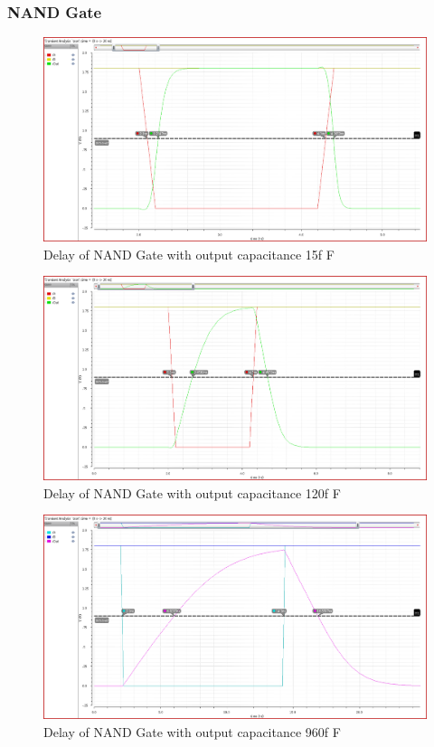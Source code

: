 \documentclass[conference]{IEEEtran}
\begin{document}
\subsubsection{NAND Gate}
\begin{figure}[h!]
    \centering
    \includegraphics[width=0.9\linewidth]{nand2_C1.png}
    \caption{Delay of NAND Gate with output capacitance 15f F}
\end{figure}

\begin{figure}[h!]
    \centering
    \includegraphics[width=0.9\linewidth]{nand2_C2.png}
    \caption{Delay of NAND Gate with output capacitance 120f F}
\end{figure}

\begin{figure}[h!]
    \centering
    \includegraphics[width=0.9\linewidth]{nand2_C3.png}
    \caption{Delay of NAND Gate with output capacitance 960f F}
\end{figure}
\end{document}
